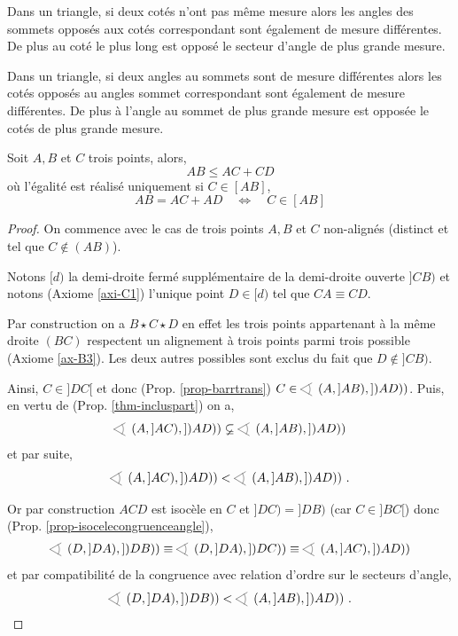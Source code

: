 \begin{lem}
Dans un triangle, si deux cotés n'ont pas même mesure alors les angles des sommets opposés aux cotés correspondant sont également de mesure différentes. De plus au coté le plus long est opposé le secteur d'angle de plus grande mesure. 
\end{lem}
\begin{lem}\label{lem-i3}
Dans un triangle, si deux angles au sommets sont de mesure différentes alors les cotés opposés au angles sommet correspondant sont également de mesure différentes. De plus à l'angle au sommet de plus grande mesure est opposée le cotés de plus grande mesure.  
\end{lem}


\begin{thm}
Soit $A,B$ et $C$ trois points, alors,
\begin{equation*}
AB \leq AC + CD
\end{equation*}
où l'égalité est réalisé uniquement si $C\in [AB]$,
\begin{equation*}
    AB = AC + AD \quad \Longleftrightarrow \quad C\in [AB] 
\end{equation*}

\begin{proof}
On commence avec le cas de trois points $A,B$ et $C$ non-alignés (distinct et tel que $C\notin (AB)$). 

Notons $[d)$ la demi-droite fermé supplémentaire de la demi-droite ouverte $]CB)$ et notons (Axiome \ref{axi-C1}) l'unique point $D \in [d)$ tel que $CA\equiv CD$.  

Par construction on a $B\star C \star D$ en effet les trois points appartenant à la même droite $(BC)$ respectent un alignement à trois points parmi trois possible (Axiome \ref{ax-B3}). Les deux autres possibles sont exclus du fait que $D \notin ]CB)$. 

Ainsi, $C \in ]DC[$ et donc (Prop. \ref{prop-barrtrans}) $C\in \anglesaillant \left( A,]AB),])AD)\right)$. Puis, en vertu de (Prop. \ref{thm-incluspart}) on a,
\begin{equation*}
\anglesaillant \left( A,]AC),])AD)\right)\varsubsetneq \anglesaillant \left( A,]AB),])AD)\right)
\end{equation*}
et par suite,
\begin{equation*}
\anglesaillant \left( A,]AC),])AD)\right) < \anglesaillant \left( A,]AB),])AD)\right)\,.
\end{equation*}  

Or par construction $ACD$ est isocèle en $C$ et $]DC)=]DB)$ (car $C\in]BC[$) donc (Prop. \ref{prop-isocelecongruenceangle}),
 \begin{align*}
\anglesaillant \left( D,]DA),])DB)\right) \equiv \anglesaillant \left( D,]DA),])DC)\right)  \equiv \anglesaillant \left( A,]AC),])AD)\right) 
\end{align*}
et par compatibilité de la congruence avec relation d'ordre sur le secteurs d'angle,
\begin{equation*}
    \anglesaillant \left( D,]DA),])DB)\right) < \anglesaillant \left( A,]AB),])AD)\right)\,.
\end{equation*}


\end{proof}
\end{thm}
